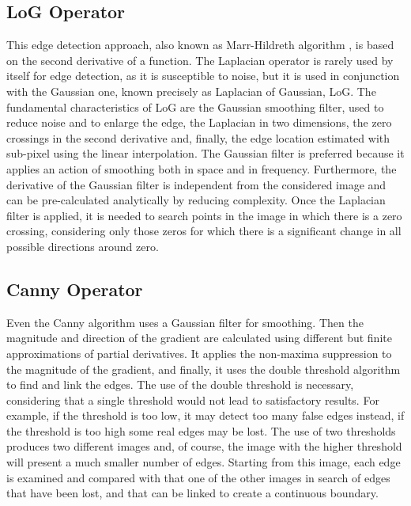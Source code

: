 \subsection{LoG Operator} %
This edge detection approach, also known as Marr-Hildreth algorithm \cite{Marr}, is based on the second derivative of a function. The Laplacian operator is rarely used by itself for edge detection, as it is susceptible to noise, but it is used in conjunction with the Gaussian one, known precisely as Laplacian of Gaussian, LoG. The fundamental characteristics of LoG are the Gaussian smoothing filter, used to reduce noise and to enlarge the edge, the Laplacian in two dimensions, the zero crossings in the second derivative and, finally, the edge location estimated with sub-pixel using the linear interpolation. The Gaussian filter is preferred because it applies an action of smoothing both in space and in frequency. Furthermore, the derivative of the Gaussian filter is independent from the considered image and can be pre-calculated analytically by reducing complexity. Once the Laplacian filter is applied, it is needed to search points in the image in which there is a zero crossing, considering only those zeros for which there is a significant change in all possible directions around zero.

\subsection{Canny Operator}
Even the Canny algorithm \cite{Canny} uses a Gaussian filter for smoothing. Then the magnitude and direction of the gradient are calculated using different but finite approximations of partial derivatives. It applies the non-maxima suppression to the magnitude of the gradient, and finally, it uses the double threshold algorithm to find and link the edges. The use of the double threshold is necessary, considering that a single threshold would not lead to satisfactory results. For example, if the threshold is too low, it may detect too many false edges instead, if the threshold is too high some real edges may be lost. The use of two thresholds produces two different images and, of course, the image with the higher threshold will present a much smaller number of edges. Starting from this image, each edge is examined and compared with that one of the other images in search of edges that have been lost, and that can be linked to create a continuous boundary.

